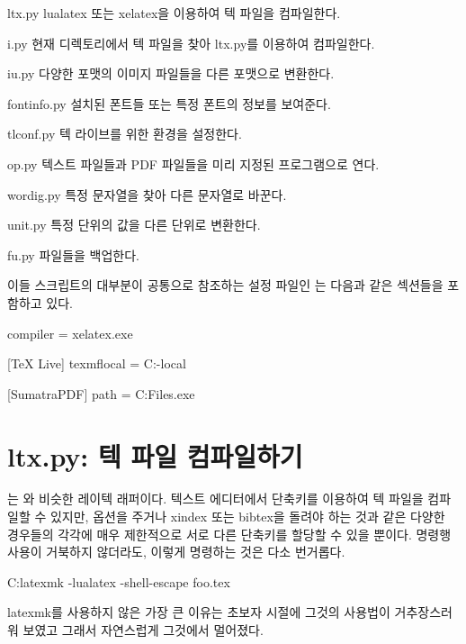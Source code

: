 \begin{macros}
\item[ltx.py] lualatex 또는 xelatex을 이용하여 텍 파일을 컴파일한다.
\item[i.py] 현재 디렉토리에서 텍 파일을 찾아 ltx.py를 이용하여 컴파일한다.
\item[iu.py] 다양한 포맷의 이미지 파일들을 다른 포맷으로 변환한다.
\item[fontinfo.py] 설치된 폰트들 또는 특정 폰트의 정보를 보여준다.
\item[tlconf.py] 텍 라이브를 위한 환경을 설정한다.
\item[op.py] 텍스트 파일들과 PDF 파일들을 미리 지정된 프로그램으로 연다.
\item[wordig.py] 특정 문자열을 찾아 다른 문자열로 바꾼다.
\item[unit.py] 특정 단위의 값을 다른 단위로 변환한다.
\item[fu.py] 파일들을 백업한다.
\end{macros}

이들 스크립트의 대부분이 공통으로 참조하는 설정 파일인 는 다음과 같은 섹션들을 포함하고 있다.

\begin{codewrite}
[LaTeX]
compiler = xelatex.exe

[TeX Live]
texmflocal = C:\texlive\texmf-local\tex\latex\local

[SumatraPDF]
path = C:\Program Files\SumatraPDF\SumatraPDF.exe
\end{codewrite}
\coderead[language=ini]

\section{ltx.py: 텍 파일 컴파일하기}

는 와 비슷한 레이텍 래퍼이다.
텍스트 에디터에서 단축키를 이용하여 텍 파일을 컴파일할 수 있지만,  옵션을 주거나 xindex 또는 bibtex을 돌려야 하는 것과 같은 다양한 경우들의 각각에 매우 제한적으로 서로 다른 단축키를 할당할 수 있을 뿐이다.
명령행 사용이 거북하지 않더라도, 이렇게 명령하는 것은 다소 번거롭다.

\begin{code}
C:\>latexmk -lualatex -shell-escape foo.tex
\end{code}

latexmk를 사용하지 않은 가장 큰 이유는 초보자 시절에 그것의 사용법이 거추장스러워 보였고 그래서 자연스럽게 그것에서 멀어졌다.

